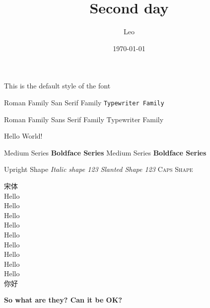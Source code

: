 \documentclass{article}
\title{Second day}
\author{Leo}
\date{\today}
\begin{document}
\maketitle

This is the default style of the font

\textrm{Roman Family} \textsf{San Serif Family} \texttt{Typewriter Family}


{\rmfamily Roman Family} {\sffamily Sans Serif Family} {\ttfamily Typewriter Family}

\sffamily Hello World!

\textmd{Medium Series} \textbf{Boldface Series}
{\mdseries Medium Series} {\bfseries Boldface Series}

\textup{Upright Shape} \textit{Italic shape 123}
{\slshape Slanted Shape 123} {\scshape Caps Shape}

{\songti 宋体}\\
{\tiny Hello} \\
{\scriptsize Hello} \\
{\footnotesize Hello} \\
{\small Hello} \\
{\normalsize Hello} \\
{\large Hello} \\
{\LARGE Hello} \\
{\huge Hello} \\
{\Huge Hello} \\
{你好}


{\bfseries
So what are they?
Can it be OK?
}
\end{document}
